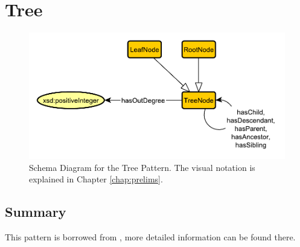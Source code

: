 \section{Tree}
\label{sec:Tree}
\begin{figure}[h!]
\begin{center}
\includegraphics[width=.8\textwidth]{figures/tree}
\end{center}
\caption{Schema Diagram for the Tree Pattern. The visual notation is explained in Chapter \ref{chap:prelims}.}
\label{fig:Tree}
\end{figure}
\subsection{Summary}
\label{sum:Tree}
This pattern is borrowed from \cite{tree}, more detailed information can be found there.

